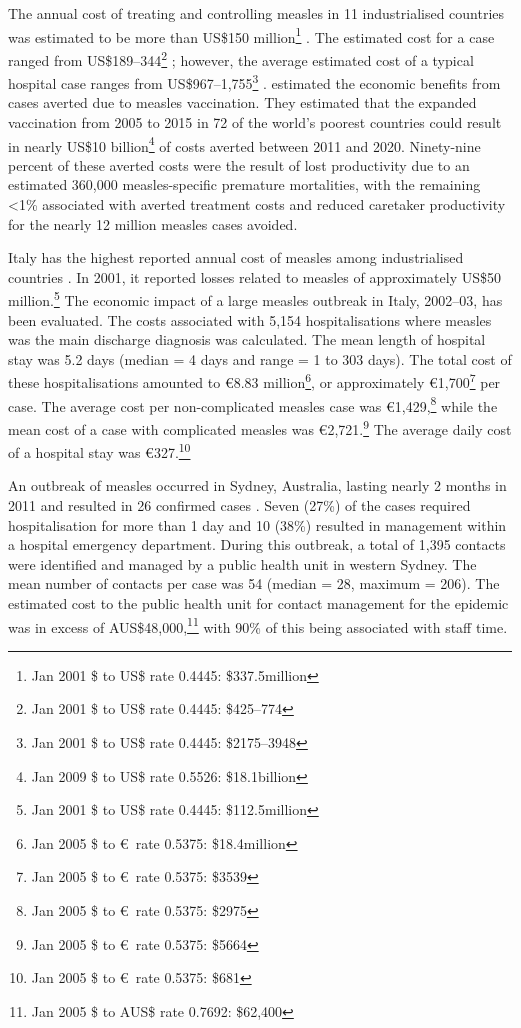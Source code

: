 \documentclass{article}
\begin{document}
The annual cost of treating and controlling measles in 11 industrialised countries was estimated to be more than US\$150 million\footnote{Jan 2001 \$ to US\$ rate 0.4445: \$337.5million} \citep{carabin3}. The estimated cost for a case ranged from US\$189--344\footnote{Jan 2001 \$ to US\$ rate 0.4445: \$425--774} \citep{carabin3}; however, the average estimated cost of a typical hospital case ranges from US\$967--1,755\footnote{Jan 2001 \$ to US\$ rate 0.4445: \$2175--3948} \citep{carabin2}. \citep{stack11} estimated the economic benefits from cases averted due to measles vaccination. They estimated that the expanded vaccination from 2005 to 2015 in 72 of the world's poorest countries could result in nearly US\$10 billion\footnote{Jan 2009 \$ to US\$ rate 0.5526: \$18.1billion} of costs averted between 2011 and 2020. Ninety-nine percent of these averted costs were the result of lost productivity due to an estimated 360,000 measles-specific premature mortalities, with the remaining <1\% associated with averted treatment costs and reduced caretaker productivity for the nearly 12 million measles cases avoided.

Italy has the highest reported annual cost of measles among industrialised countries \citep{carabin3}. In 2001, it reported losses related to measles of approximately US\$50 million.\footnote{Jan 2001 \$ to US\$ rate 0.4445: \$112.5million} The economic impact of a large measles outbreak in Italy, 2002--03, has been evaluated. The costs associated with 5,154 hospitalisations where measles was the main discharge diagnosis was calculated. The mean length of hospital stay was 5.2 days (median = 4 days and range = 1 to 303 days). The total cost of these hospitalisations amounted to \euro 8.83 million\footnote{Jan 2005 \$ to \euro\ rate 0.5375: \$18.4million}, or approximately \euro 1,700\footnote{Jan 2005 \$ to \euro\ rate 0.5375: \$3539} per case. The average cost per non-complicated measles case was  \euro 1,429,\footnote{Jan 2005 \$ to \euro\ rate 0.5375: \$2975} while the mean cost of a case with complicated measles was  \euro 2,721.\footnote{Jan 2005 \$ to \euro\ rate 0.5375: \$5664} The average daily cost of a hospital stay was  \euro 327.\footnote{Jan 2005 \$ to \euro\ rate 0.5375: \$681}

An outbreak of measles occurred in Sydney, Australia, lasting nearly 2 months in 2011 and resulted in 26 confirmed cases \citep{flego13}. Seven (27\%) of the cases required hospitalisation for more than 1 day and 10 (38\%) resulted in management within a hospital emergency department. During this outbreak, a total of 1,395 contacts were identified and managed by a public health unit in western Sydney. The mean number of contacts per case was 54 (median = 28, maximum = 206). The estimated cost to the public health unit for contact management for the epidemic was in excess of AUS\$48,000,\footnote{Jan 2005 \$ to AUS\$ rate 0.7692: \$62,400} with 90\% of this being associated with staff time. 
\end{document}
